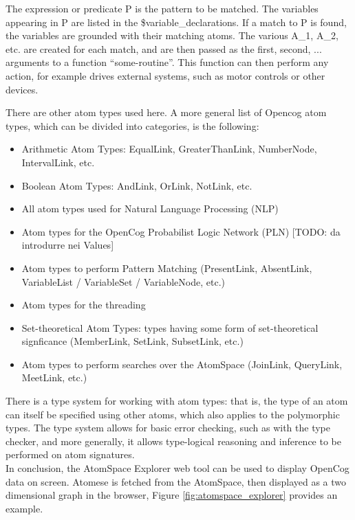 \begin{itemize}
The expression or predicate P is the pattern to be matched. The variables appearing in P are listed in the \$variable\_declarations. If a match to P is found, the variables are grounded with their matching atoms. The various A\_1, A\_2, etc. are created for each match, and are then passed as the first, second, ... arguments to a function \enquote{some-routine}. This function can then perform any action, for example drives external systems, such as motor controls or other devices.
\end{itemize}

There are other atom types used here. A more general list of Opencog atom types, which can be divided into categories, is the following:

\begin{itemize}
\item Arithmetic Atom Types: EqualLink, GreaterThanLink, NumberNode, IntervalLink, etc.
\item Boolean Atom Types: AndLink, OrLink, NotLink, etc. 
\item All atom types used for Natural Language Processing (NLP)
\item Atom types for the OpenCog Probabilist Logic Network (PLN) [TODO: da introdurre nei Values]
\item Atom types to perform Pattern Matching (PresentLink, AbsentLink, VariableList / VariableSet / VariableNode, etc.) 
\item Atom types for the threading 
\item Set-theoretical Atom Types: types having some form of set-theoretical signficance (MemberLink, SetLink, SubsetLink, etc.)
\item Atom types to perform searches over the AtomSpace (JoinLink, QueryLink, MeetLink, etc.) 
\end{itemize}

There is a type system for working with atom types: that is, the type of an atom can itself be specified using other atoms, which also applies to the polymorphic types. The type system allows for basic error checking, such as with the type checker, and more generally, it allows type-logical reasoning and inference to be performed on atom signatures. \\

In conclusion, the AtomSpace Explorer web tool can be used to display OpenCog data on screen. Atomese is fetched from the AtomSpace, then displayed as a two dimensional graph in the browser, Figure \ref{fig:atomspace_explorer} provides an example. 

